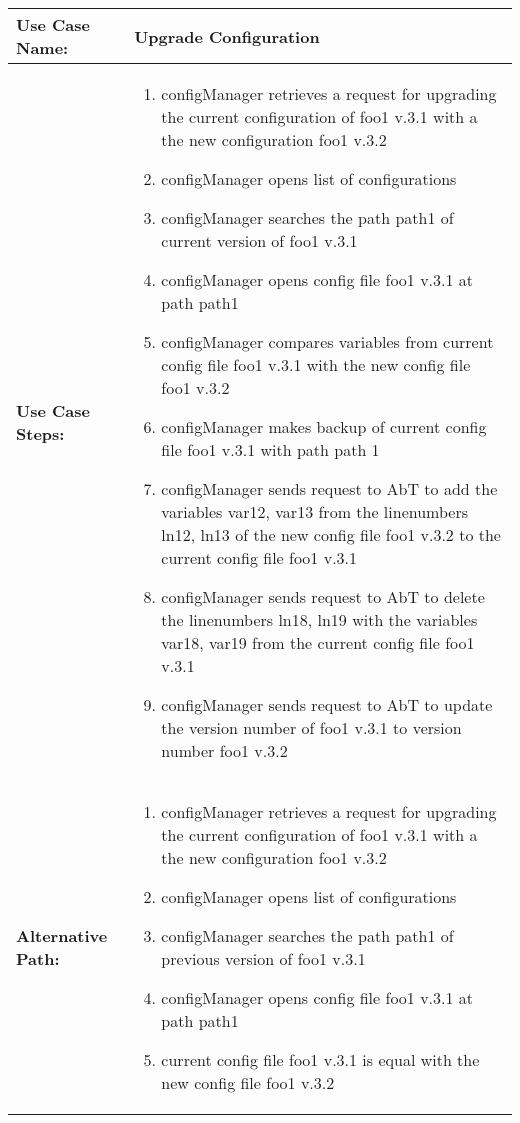 
\begin{tabularx}{\linewidth}{|l|X|}
\hline
\textbf{Use Case Name:} & \textbf{Upgrade Configuration} \\
\hline
\textbf{Use Case Steps:} & 
\begin{minipage}{\linewidth} 
  \vspace{0.05em}
  \begin{enumerate}
	\item configManager retrieves a request for upgrading the current configuration of foo1 v.3.1 with a the new configuration foo1 v.3.2
	\item configManager opens list of configurations
	\item configManager searches the path path1 of current version of foo1 v.3.1
	\item configManager opens config file foo1 v.3.1 at path path1
	\item configManager compares variables from current config file foo1 v.3.1 with the new config file foo1 v.3.2
	\item configManager makes backup of current config file foo1 v.3.1 with path path 1
	\item configManager sends request to AbT to add the variables var12, var13 from the linenumbers ln12, ln13 of the new config file foo1 v.3.2 to the current config file foo1 v.3.1
	\item configManager sends request to AbT to delete the linenumbers ln18, ln19 with the variables var18, var19 from the current config file foo1 v.3.1
	\item configManager sends request to AbT to update the version number of foo1 v.3.1 to version number foo1 v.3.2
  \end{enumerate}
  \vspace{0.05em}
\end{minipage}
\\
\hline 
\textbf{Alternative Path:} &
\begin{minipage}{\linewidth}
  \vspace{0.05em} 
  \begin{enumerate}
	\item configManager retrieves a request for upgrading the current configuration of foo1 v.3.1 with a the new configuration foo1 v.3.2
	\item configManager opens list of configurations
	\item configManager searches the path path1 of previous version of foo1 v.3.1
	\item configManager opens config file foo1 v.3.1 at path path1
	\item current config file foo1 v.3.1 is equal with the new config file foo1 v.3.2
  \end{enumerate}
  \vspace{0.05em} 
\end{minipage}
\\
\hline
\end{tabularx}


